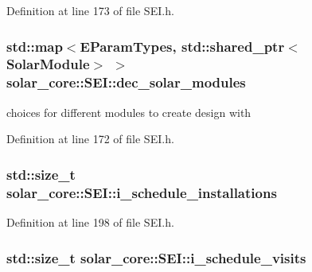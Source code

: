 \begin{figure}[H]
\begin{center}
Definition at line 173 of file S\+E\+I.\+h.

\hypertarget{classsolar__core_1_1_s_e_i_a79728143af5752e09c2be29cfa1cfd8f}{}
\subsubsection[{dec\+\_\+solar\+\_\+modules}]{\setlength{\rightskip}{0pt plus 5cm}std\+::map$<${\bf E\+Param\+Types}, std\+::shared\+\_\+ptr$<${\bf Solar\+Module}$>$ $>$ solar\+\_\+core\+::\+S\+E\+I\+::dec\+\_\+solar\+\_\+modules\hspace{0.3cm}{\ttfamily [protected]}}\label{classsolar__core_1_1_s_e_i_a79728143af5752e09c2be29cfa1cfd8f}
choices for different modules to create design with 

Definition at line 172 of file S\+E\+I.\+h.

\hypertarget{classsolar__core_1_1_s_e_i_ad906dcd5b638e405a7daf14539096377}{}
\subsubsection[{i\+\_\+schedule\+\_\+installations}]{\setlength{\rightskip}{0pt plus 5cm}std\+::size\+\_\+t solar\+\_\+core\+::\+S\+E\+I\+::i\+\_\+schedule\+\_\+installations\hspace{0.3cm}{\ttfamily [protected]}}\label{classsolar__core_1_1_s_e_i_ad906dcd5b638e405a7daf14539096377}


Definition at line 198 of file S\+E\+I.\+h.

\hypertarget{classsolar__core_1_1_s_e_i_a3ff238346bd126ee39aa37bfee41be43}{}
\subsubsection[{i\+\_\+schedule\+\_\+visits}]{\setlength{\rightskip}{0pt plus 5cm}std\+::size\+\_\+t solar\+\_\+core\+::\+S\+E\+I\+::i\+\_\+schedule\+\_\+visits\hspace{0.3cm}{\ttfamily [protected]}}\label{classsolar__core_1_1_s_e_i_a3ff238346bd126ee39aa37bfee41be43}



\end{center}
\end{figure}
